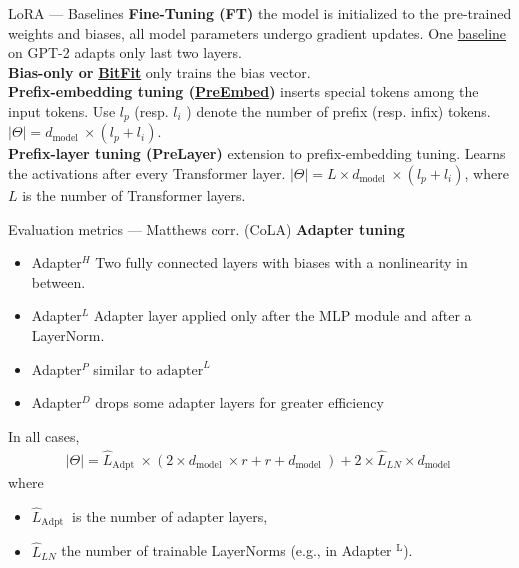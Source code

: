 \documentclass[aspectratio=169,xcolor=dvipsnames]{beamer}
\begin{document}

\begin{frame}[c]{LoRA --- Baselines} 
    \textbf{Fine-Tuning (FT)} the model is initialized to the pre-trained weights and biases, all model parameters undergo gradient updates. One \href{https://arxiv.org/pdf/2101.00190}{baseline} on GPT-2 adapts only last two layers. \\
    \medskip
    \textbf{Bias-only or} \href{https://arxiv.org/abs/2106.10199}{\textbf{BitFit}} only trains the bias vector. \\
    \medskip
    \textbf{Prefix-embedding tuning (\href{https://arxiv.org/abs/2101.00190}{\textbf{PreEmbed}})} inserts special tokens among the input tokens. Use $l_{p}$ (resp. $l_{i}$ ) denote the number of prefix (resp. infix) tokens. $|\Theta|=d_{\text {model }} \times\left(l_{p}+l_{i}\right)$.\\
    \medskip
    \textbf{Prefix-layer tuning (PreLayer)} extension to prefix-embedding tuning. Learns the activations after every Transformer layer. $|\Theta|=L \times d_{\text {model }} \times\left(l_{p}+l_{i}\right)$, where $L$ is the number of Transformer layers.\\
\end{frame}


\begin{frame}{Evaluation metrics --- Matthews corr. (CoLA)}
    \textbf{Adapter tuning} 
    \begin{itemize}
        \item Adapter${ }^{H}$ Two fully connected layers with biases with a nonlinearity in between.
        \item Adapter${ }^{L}$ Adapter layer applied only after the MLP module and after a LayerNorm.
        \item Adapter${ }^{P}$ similar to $\text{adapter}^L$
        \item Adapter${ }^{D}$ drops some adapter layers for greater efficiency
    \end{itemize}
    \medskip
    In all cases, 
    \begin{align*}
        |\Theta|=\hat{L}_{\text {Adpt }} \times\left(2 \times d_{\text {model }} \times r+r+d_{\text {model }}\right)+2 \times \hat{L}_{L N} \times d_{\text {model }}
    \end{align*}
    where \\
    \begin{itemize}
        \item $\hat{L}_{\text {Adpt }}$ is the number of adapter layers,
        \item $\hat{L}_{L N}$ the number of trainable LayerNorms (e.g., in Adapter ${ }^{\mathrm{L}}$).
    \end{itemize}

    
\end{frame}
\end{document}
